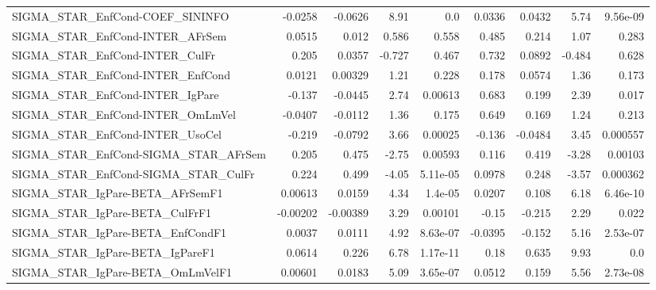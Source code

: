 \begin{tabular}{lrrrrrrrr}
SIGMA\_STAR\_EnfCond-COEF\_SININFO       &     -0.0258 &      -0.0626 &    8.91 &      0.0 &     0.0336 &      0.0432 &         5.74 &      9.56e-09 \\
SIGMA\_STAR\_EnfCond-INTER\_AFrSem       &      0.0515 &        0.012 &   0.586 &    0.558 &      0.485 &       0.214 &         1.07 &         0.283 \\
SIGMA\_STAR\_EnfCond-INTER\_CulFr        &       0.205 &       0.0357 &  -0.727 &    0.467 &      0.732 &      0.0892 &       -0.484 &         0.628 \\
SIGMA\_STAR\_EnfCond-INTER\_EnfCond      &      0.0121 &      0.00329 &    1.21 &    0.228 &      0.178 &      0.0574 &         1.36 &         0.173 \\
SIGMA\_STAR\_EnfCond-INTER\_IgPare       &      -0.137 &      -0.0445 &    2.74 &  0.00613 &      0.683 &       0.199 &         2.39 &         0.017 \\
SIGMA\_STAR\_EnfCond-INTER\_OmLmVel      &     -0.0407 &      -0.0112 &    1.36 &    0.175 &      0.649 &       0.169 &         1.24 &         0.213 \\
SIGMA\_STAR\_EnfCond-INTER\_UsoCel       &      -0.219 &      -0.0792 &    3.66 &  0.00025 &     -0.136 &     -0.0484 &         3.45 &      0.000557 \\
SIGMA\_STAR\_EnfCond-SIGMA\_STAR\_AFrSem  &       0.205 &        0.475 &   -2.75 &  0.00593 &      0.116 &       0.419 &        -3.28 &       0.00103 \\
SIGMA\_STAR\_EnfCond-SIGMA\_STAR\_CulFr   &       0.224 &        0.499 &   -4.05 & 5.11e-05 &     0.0978 &       0.248 &        -3.57 &      0.000362 \\
SIGMA\_STAR\_IgPare-BETA\_AFrSemF1       &     0.00613 &       0.0159 &    4.34 &  1.4e-05 &     0.0207 &       0.108 &         6.18 &      6.46e-10 \\
SIGMA\_STAR\_IgPare-BETA\_CulFrF1        &    -0.00202 &     -0.00389 &    3.29 &  0.00101 &      -0.15 &      -0.215 &         2.29 &         0.022 \\
SIGMA\_STAR\_IgPare-BETA\_EnfCondF1      &      0.0037 &       0.0111 &    4.92 & 8.63e-07 &    -0.0395 &      -0.152 &         5.16 &      2.53e-07 \\
SIGMA\_STAR\_IgPare-BETA\_IgPareF1       &      0.0614 &        0.226 &    6.78 & 1.17e-11 &       0.18 &       0.635 &         9.93 &           0.0 \\
SIGMA\_STAR\_IgPare-BETA\_OmLmVelF1      &     0.00601 &       0.0183 &    5.09 & 3.65e-07 &     0.0512 &       0.159 &         5.56 &      2.73e-08 \\

\end{tabular}
